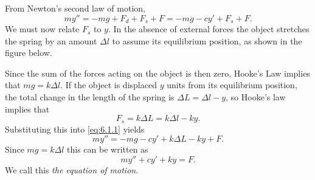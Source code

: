 \documentclass{ximera}
\begin{document}
 
 
From Newton's second law of motion,
\begin{equation}\label{eq:6.1.1}
my''=-mg+F_d+F_s+F=-mg-cy'+F_s+F.
\end{equation}
We must now relate $F_s$ to $y$. In the absence of external forces the
object stretches the spring by an amount $\Delta l$ to assume its
equilibrium position, as shown in the figure below.

\begin{center}
\end{center}

 
Since the sum of the forces acting on the object
is then zero, Hooke's Law implies that $mg=k\Delta l$. If the object
is displaced $y$ units from its equilibrium position, the total
change in the length of the spring is $\Delta L=\Delta l-y$,
 so Hooke's law implies that
 $$
F_s=k\Delta L=k\Delta l-ky.
$$
Substituting this into \eqref{eq:6.1.1} yields
$$
my''=-mg-cy'+k\Delta L-ky+F.
$$
Since $mg=k\Delta l$ this can be written as
\begin{equation}\label{eq:6.1.2}
my''+cy'+ky=F.
\end{equation}
We call this \textit{the equation of motion}.
 
\end{document}
